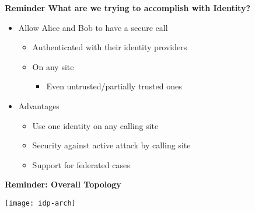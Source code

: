 \documentclass[helvetica]{seminar}
\newcommand{\heading}[1]{%
  \begin{center} 
    \large\bf 
    #1 
  \end{center} 
  \vspace{.4 in}}
\begin{document}
\begin{slide}
\heading{Reminder What are we trying to accomplish with Identity?}

\begin{itemize}
\item Allow Alice and Bob to have a secure call
  \begin{itemize}
  \item Authenticated with their identity providers
  \item On any site
    \begin{itemize}
    \item Even untrusted/partially trusted ones
    \end{itemize}
  \end{itemize}

\item Advantages
  \begin{itemize}
  \item Use one identity on any calling site
  \item Security against active attack by calling site
  \item Support for federated cases
  \end{itemize}
\end{itemize}

\end{slide}

\begin{slide}
\heading{Reminder: Overall Topology}
\vspace{-.4in}

{\center
\hspace{.75in} \texttt{[image: idp-arch]}
}

\end{slide}
\end{document}
